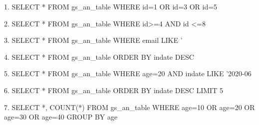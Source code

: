 1.  SELECT * FROM gs_an_table WHERE id=1 OR id=3 OR id=5

2.  SELECT * FROM gs_an_table WHERE id>=4 AND id <=8

3.  SELECT * FROM gs_an_table WHERE email LIKE '%

4.  SELECT * FROM gs_an_table ORDER BY indate DESC

5.  SELECT * FROM gs_an_table WHERE age=20 AND indate LIKE '2020-06%

6.  SELECT * FROM gs_an_table ORDER BY indate DESC LIMIT 5

7.  SELECT *, COUNT(*) FROM gs_an_table WHERE age=10 OR age=20 OR age=30 OR age=40 GROUP BY age
